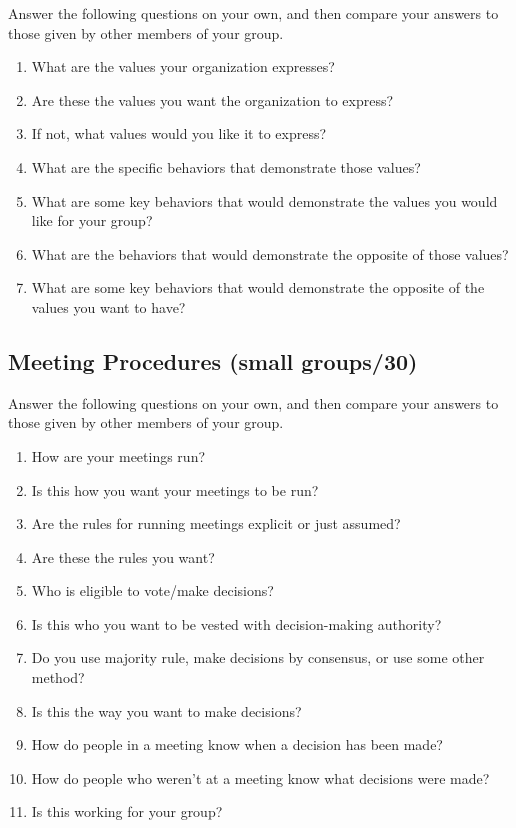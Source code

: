 Answer the following questions on your own, and then compare your
answers to those given by other members of your group.

\begin{enumerate}
\item
  What are the values your organization expresses?
\item
  Are these the values you want the organization to express?
\item
  If not, what values would you like it to express?
\item
  What are the specific behaviors that demonstrate those values?
\item
  What are some key behaviors that would demonstrate the values you
  would like for your group?
\item
  What are the behaviors that would demonstrate the opposite of those
  values?
\item
  What are some key behaviors that would demonstrate the opposite of
  the values you want to have?
\end{enumerate}

\subsection{Meeting Procedures (small groups/30)}\label{meeting-procedures-small-groups30}

Answer the following questions on your own, and then compare your
answers to those given by other members of your group.

\begin{enumerate}
\item
  How are your meetings run?
\item
  Is this how you want your meetings to be run?
\item
  Are the rules for running meetings explicit or just assumed?
\item
  Are these the rules you want?
\item
  Who is eligible to vote/make decisions?
\item
  Is this who you want to be vested with decision-making authority?
\item
  Do you use majority rule, make decisions by consensus, or use some
  other method?
\item
  Is this the way you want to make decisions?
\item
  How do people in a meeting know when a decision has been made?
\item
  How do people who weren't at a meeting know what decisions were
  made?
\item
  Is this working for your group?
\end{enumerate}

